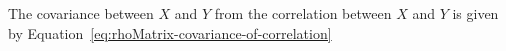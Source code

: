 \noindent The covariance between
$
X
$
and
$
Y
$
from the correlation between
$
X
$
and
$
Y
$
is given by
Equation~\eqref{eq:rhoMatrix-covariance-of-correlation}
